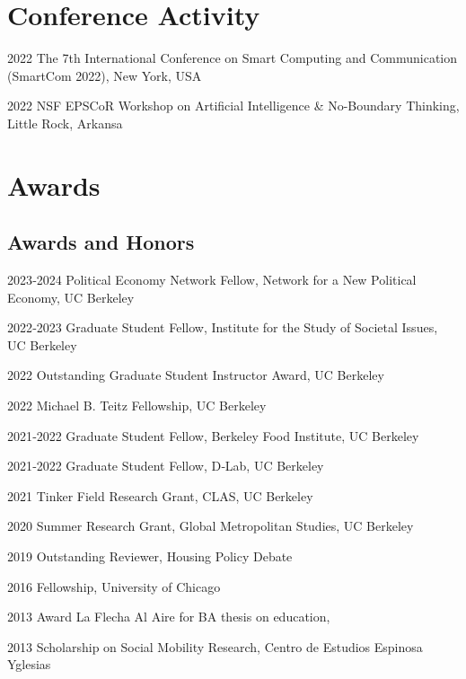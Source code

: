 \documentclass[12pt,letterpaper]{report}
\begin{document}

    \section*{Conference Activity}
    \begin{tablist}
        \item[2022] \tab{}The 7th International Conference on Smart Computing and Communication (SmartCom 2022), New York, USA
        \item[2022] \tab{}NSF EPSCoR Workshop on Artificial Intelligence \& No-Boundary Thinking, Little Rock, Arkansa
    \end{tablist}

    \section*{Awards}
    \subsection*{Awards and Honors}
    \begin{tablist}
        \item[2023‐2024] \tab{}Political Economy Network Fellow, Network for a New Political Economy, UC Berkeley 
        \item[2022‐2023] \tab{}Graduate Student Fellow, Institute for the Study of Societal Issues, UC Berkeley
        \item[2022     ] \tab{}Outstanding Graduate Student Instructor Award, UC Berkeley
        \item[2022     ] \tab{}Michael B. Teitz Fellowship, UC Berkeley 
        \item[2021‐2022] \tab{}Graduate Student Fellow, Berkeley Food Institute, UC Berkeley
        \item[2021‐2022] \tab{}Graduate Student Fellow, D‐Lab, UC Berkeley
        \item[2021     ] \tab{}Tinker Field Research Grant, CLAS, UC Berkeley
        \item[2020     ] \tab{}Summer Research Grant, Global Metropolitan Studies, UC Berkeley
        \item[2019     ] \tab{}Outstanding Reviewer, Housing Policy Debate
        \item[2016     ] \tab{}Fellowship, University of Chicago
        \item[2013     ] \tab{}Award La Flecha Al Aire for BA thesis on education,
        \item[2013     ] \tab{}Scholarship on Social Mobility Research, Centro de Estudios Espinosa Yglesias
    \end{tablist}
\end{document}
